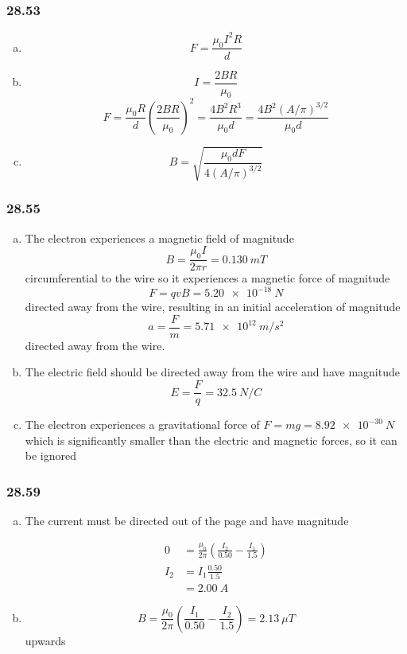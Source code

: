 \documentclass{article}
\begin{document}
\subsubsection{28.53}

\begin{enumerate}[(a)]
  \item \[F = \frac{\mu_0 I^2 R}{d}\]

  \item \[I = \frac{2 B R}{\mu_0}\] \[F = \frac{\mu_0 R}{d} \left( \frac{2 B R}{\mu_0} \right)^2 = \frac{4 B^2 R^3}{\mu_0 d} = \frac{4 B^2 (A / \pi)^{3/2}}{\mu_0 d}\]

  \item \[B = \sqrt{\frac{\mu_0 d F}{4 (A / \pi)^{3/2}}}\]
\end{enumerate}

\subsubsection{28.55}

\begin{enumerate}[(a)]
  \item The electron experiences a magnetic field of magnitude \[B = \frac{\mu_0 I}{2 \pi r} = \qty{0.130}{mT}\] circumferential to the wire so it experiences a magnetic force of magnitude \[F = q v B = \qty{5.20e-18}{N}\] directed away from the wire, resulting in an initial acceleration of magnitude \[a = \frac{F}{m} = \qty{5.71e12}{m/s^2}\] directed away from the wire.

  \item The electric field should be directed away from the wire and have magnitude \[E = \frac{F}{q} = \qty{32.5}{N/C}\]

  \item The electron experiences a gravitational force of $F = m g = \qty{8.92e-30}{N}$ which is significantly smaller than the electric and magnetic forces, so it can be ignored
\end{enumerate}

\subsubsection{28.59}

\begin{enumerate}[(a)]
  \item The current must be directed out of the page and have magnitude

        \begin{align*}
          0   & = \frac{\mu_0}{2 \pi} \left( \frac{I_2}{0.50} - \frac{I_1}{1.5} \right) \\
          I_2 & = I_1 \frac{0.50}{1.5}                                                  \\
              & = \qty{2.00}{A}
        \end{align*}

  \item \[B = \frac{\mu_0}{2 \pi} \left( \frac{I_1}{0.50} - \frac{I_2}{1.5} \right) = \qty{2.13}{\mu T}\] upwards
\end{enumerate}
\end{document}
